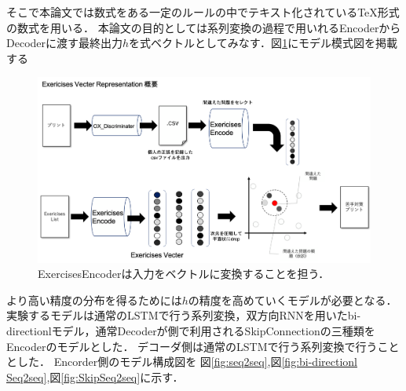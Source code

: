 \documentclass[a4paper,twocolumn]{jsarticle}
\begin{document}
そこで本論文では数式をある一定のルールの中でテキスト化されている{\TeX}形式の数式を用いる．
本論文の目的としては系列変換の過程で用いれるEncoderからDecoderに渡す最終出力$h$を式ベクトルとしてみなす．図\ref{fig:EVS_Simple}にモデル模式図を掲載する

\begin{center}
  \begin{figure}[htb]
    \centering
    \includegraphics[width=0.8\linewidth]{image/EVS_Simpie.png}
    \caption{ExercisesEncoderは入力をベクトルに変換することを担う．}
    \label{fig:EVS_Simple}
  \end{figure}
\end{center}

より高い精度の分布を得るためには$h$の精度を高めていくモデルが必要となる．
実験するモデルは通常のLSTMで行う系列変換，双方向RNNを用いたbi-directionlモデル，通常Decoderが側で利用されるSkipConnectionの三種類をEncoderのモデルとした．
デコーダ側は通常のLSTMで行う系列変換で行うこととした．
Encorder側のモデル構成図を
図\ref{fig:seq2seq},図\ref{fig:bi-directionl Seq2seq},図\ref{fig:SkipSeq2seq}に示す．
\end{document}
